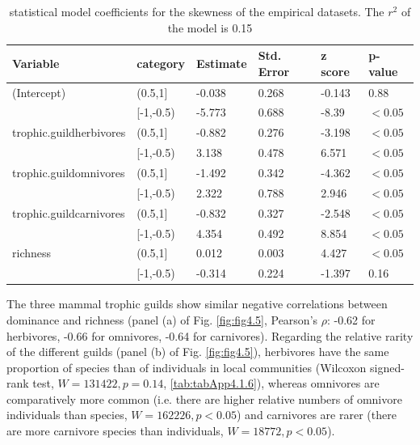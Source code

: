 \begin{table}[htbp!]
\centering
\caption[Skewness model coefficients]{\color{Gray} statistical model coefficients for the skewness of the empirical datasets. The $r^2$ of the model is 0.15}\label{tab:tab4.4}
\begin{tabular}{llllll}
\hline
Variable & category & Estimate & Std. Error & z score & p-value \\
\hline
(Intercept)              & (0.5,1] & -0.038 & 0.268 & -0.143  & 0.88 \\
                         & [-1,-0.5) & -5.773  & 0.688 & -8.39 & $<0.05$ \\
trophic.guildherbivores   & (0.5,1] & -0.882 & 0.276 & -3.198 & $<0.05$ \\
                         & [-1,-0.5) & 3.138 & 0.478 & 6.571 & $<0.05$ \\
trophic.guildomnivores    & (0.5,1] & -1.492  & 0.342 & -4.362 & $<0.05$ \\
                         & [-1,-0.5) &  2.322 & 0.788 & 2.946  & $<0.05$ \\
trophic.guildcarnivores    & (0.5,1] & -0.832 & 0.327 & -2.548 & $<0.05$ \\
                         & [-1,-0.5) & 4.354 & 0.492 & 8.854 & $<0.05$ \\
richness                 & (0.5,1] & 0.012 & 0.003 & 4.427   & $<0.05$ \\
                         & [-1,-0.5) & -0.314 & 0.224  & -1.397 & 0.16 \\
\hline
\end{tabular}

\end{table}

\FloatBarrier

The three mammal trophic guilds show similar negative correlations between dominance and richness (panel (a) of Fig. \ref{fig:fig4.5}, Pearson's $\rho$: -0.62 for herbivores, -0.66 for omnivores, -0.64 for carnivores). Regarding the relative rarity of the different guilds (panel (b) of Fig. \ref{fig:fig4.5}), herbivores have the same proportion of species than of individuals in local communities (Wilcoxon signed-rank test, $W = 131422, p = 0.14$, \cref{tab:tabApp4.1.6}), whereas omnivores are comparatively more common (i.e. there are higher relative numbers of omnivore individuals than species, $W = 162226, p < 0.05$) and carnivores are rarer (there are more carnivore species than individuals, $W = 18772, p < 0.05$).

